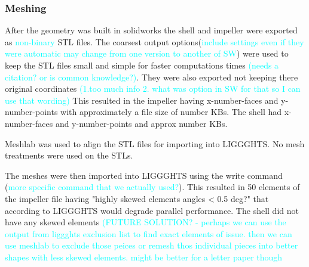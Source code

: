 \documentclass[preprint,11pt,authoryear]{elsarticle}
\begin{document}
	
	    
	
	    \subsubsection{Meshing}
	    \par After the geometry was built in solidworks the shell and impeller were exported as \textcolor{cyan}{non-binary} STL files. The coarsest output options(\textcolor{cyan}{include settings even if they were automatic may change from one version to another of SW}) were used to keep the STL files small and simple for faster computations times \textcolor{cyan}{(needs a citation? or is common knowledge?)}. They were also exported not keeping there original coordinates \textcolor{cyan}{(1.too much info 2. what was option in SW for that so I can use that wording)} This resulted in the impeller having x-number-faces and y-number-points with approximately a file size of number KBs. The shell had x-number-faces and y-number-points and approx number KBs.  
	    \par Meshlab was used to align the STL files for importing into LIGGGHTS. No mesh treatments were used on the STLs. 
	    \par The meshes were then imported into LIGGGHTS using the write command (\textcolor{cyan}{more specific command that we actually used?}). This resulted in 50 elements of the impeller file having "highly skewed elements angles < 0.5 deg?" that according to LIGGGHTS would degrade parallel performance. The shell did not have any skewed elements \textcolor{cyan}{(FUTURE SOLUTION? - perhaps we can use the output from liggghts exclusion list to find exact elements of issue. then we can use meshlab to exclude those peices or remesh thos individual pieces into better shapes with less skewed elements. might be better for a letter paper though}
	    
\end{document}
